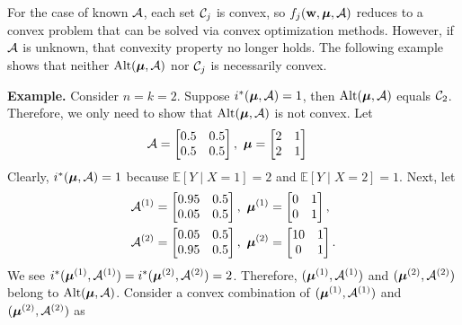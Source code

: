     For the case of known $\mathcal{A}$, each set $\mathcal{C}_j$ is convex, so $f_j(\mathbf{w}, \boldsymbol{\mu}, \mathcal{A})$ reduces to a convex problem that can be solved via convex optimization methods. However, if $\mathcal{A}$ is unknown, that convexity property no longer holds. The following example shows that neither $\text{Alt}(\boldsymbol{\mu}, \mathcal{A})$ nor $\mathcal{C}_j$ is necessarily convex.
    
    
    \textbf{Example.} Consider $n = k = 2$. Suppose $i^*(\boldsymbol{\mu}, \mathcal{A}) = 1$, then $\text{Alt}(\boldsymbol{\mu}, \mathcal{A})$ equals $\mathcal{C}_2$. Therefore, we only need to show that $\text{Alt}(\boldsymbol{\mu}, \mathcal{A})$ is not convex. Let
    \begin{align}
        &\mathcal{A} = \begin{bmatrix}
                0.5 & 0.5 \\
                0.5 & 0.5
            \end{bmatrix}, ~
        \boldsymbol{\mu} = \begin{bmatrix}
                    2 & 1 \\
                    2 & 1
        \end{bmatrix}
    \end{align}
    Clearly, \(i^*(\boldsymbol{\mu}, \mathcal{A}) = 1\) because \(\mathbb{E}[Y \mid X=1] = 2\) and \(\mathbb{E}[Y \mid X=2] = 1\). Next, let
    \begin{align}
        &\mathcal{A}^{(1)} = \begin{bmatrix}
                0.95 & 0.5 \\
                0.05 & 0.5
            \end{bmatrix}, ~
        \boldsymbol{\mu}^{(1)} = \begin{bmatrix}
                    0 & 1 \\
                    0 & 1
        \end{bmatrix}, \\
        &\mathcal{A}^{(2)} = \begin{bmatrix}
                0.05 & 0.5 \\
                0.95 & 0.5
            \end{bmatrix}, ~
        \boldsymbol{\mu}^{(2)} = \begin{bmatrix}
                    10 & 1 \\
                    0 & 1
        \end{bmatrix}.
    \end{align}
    We see $i^*(\boldsymbol{\mu}^{(1)}, \mathcal{A}^{(1)}) = i^*(\boldsymbol{\mu}^{(2)}, \mathcal{A}^{(2)}) = 2$. Therefore, $(\boldsymbol{\mu}^{(1)}, \mathcal{A}^{(1)})$ and $(\boldsymbol{\mu}^{(2)}, \mathcal{A}^{(2)})$ belong to $\text{Alt}(\boldsymbol{\mu}, \mathcal{A})$. Consider a convex combination of $(\boldsymbol{\mu}^{(1)}, \mathcal{A}^{(1)})$ and $(\boldsymbol{\mu}^{(2)}, \mathcal{A}^{(2)})$ as
    
